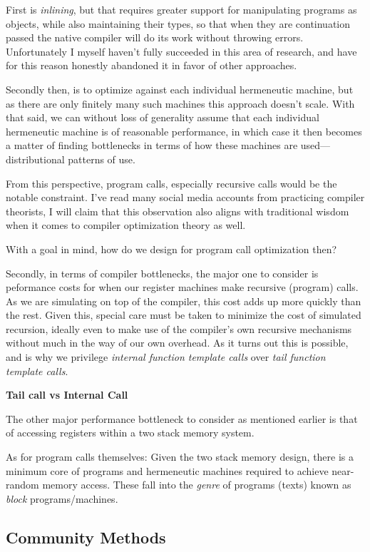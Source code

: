 \documentclass[twoside]{article}
\newcommand{\strong}[1]{{\bfseries #1}}
\begin{document}
First is \emph{inlining}, but that requires greater support for manipulating programs as objects, while also maintaining
their types, so that when they are continuation passed the native compiler will do its work without throwing errors.
Unfortunately I myself haven't fully succeeded in this area of research, and have for this reason honestly abandoned
it in favor of other approaches.

Secondly then, is to optimize against each individual hermeneutic machine, but as there are only finitely many such
machines this approach doesn't scale. With that said, we can without loss of generality assume that each individual
hermeneutic machine is of reasonable performance, in which case it then becomes a matter of finding bottlenecks
in terms of how these machines are used---distributional patterns of use.

From this perspective, program calls, especially recursive calls would be the notable constraint. I've read many
social media accounts from practicing compiler theorists, I will claim that this observation also aligns with
traditional wisdom when it comes to compiler optimization theory as well.

With a goal in mind, how do we design for program call optimization then?

Secondly, in terms of compiler bottlenecks, the major one to consider is peformance costs for when our register machines
make recursive (program) calls. As we are simulating on top of the compiler, this cost adds up more quickly than the
rest. Given this, special care must be taken to minimize the cost of simulated recursion, ideally even to make use
of the compiler's own recursive mechanisms without much in the way of our own overhead. As it turns out this is possible,
and is why we privilege \emph{internal function template calls} over \emph{tail function template calls}.

\strong{Tail call vs Internal Call}

The other major performance bottleneck to consider as mentioned earlier is that of accessing registers within
a two stack memory system.

As for program calls themselves: Given the two stack memory design, there is a minimum core of programs and hermeneutic
machines required to achieve near-random memory access. These fall into the \emph{genre} of programs (texts) known
as \emph{block} programs/machines.

\subsection*{Community Methods}
\end{document}
